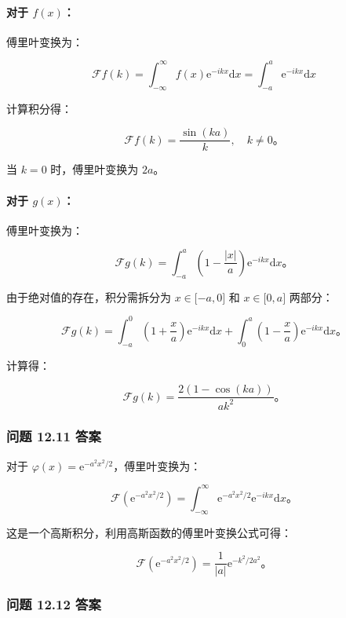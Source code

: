 \paragraph{\texorpdfstring{对于
\(f(x)\)：}{对于 f(x)：}}\label{ux5bf9ux4e8e-fx}

傅里叶变换为：

\[\mathcal{F}f(k) = \int_{- \infty}^{\infty}f(x)\mathrm{e}^{- ikx}\mathrm{d}x = \int_{- a}^{a}\mathrm{e}^{- ikx}\mathrm{d}x\]

计算积分得：

\[\mathcal{F}f(k) = \frac{\sin(ka)}{k},\quad k \neq 0。\]

当 \(k = 0\) 时，傅里叶变换为 \(2a\)。

\paragraph{\texorpdfstring{对于
\(g(x)\)：}{对于 g(x)：}}\label{ux5bf9ux4e8e-gx}

傅里叶变换为：

\[\mathcal{F}g(k) = \int_{- a}^{a}\left( 1 - \frac{|x|}{a} \right)\mathrm{e}^{- ikx}\mathrm{d}x。\]

由于绝对值的存在，积分需拆分为 \(x \in \lbrack - a,0\rbrack\) 和
\(x \in \lbrack 0,a\rbrack\) 两部分：

\[\mathcal{F}g(k) = \int_{- a}^{0}\left( 1 + \frac{x}{a} \right)\mathrm{e}^{- ikx}\mathrm{d}x + \int_{0}^{a}\left( 1 - \frac{x}{a} \right)\mathrm{e}^{- ikx}\mathrm{d}x。\]

计算得：

\[\mathcal{F}g(k) = \frac{2\left( 1 - \cos(ka) \right)}{ak^{2}}。\]

\subsubsection{问题 12.11 答案}\label{ux95eeux9898-12.11-ux7b54ux6848}

对于 \(\varphi(x) = \mathrm{e}^{- a^{2}x^{2}/2}\)，傅里叶变换为：

\[\mathcal{F}\left( \mathrm{e}^{- a^{2}x^{2}/2} \right) = \int_{- \infty}^{\infty}\mathrm{e}^{- a^{2}x^{2}/2}\mathrm{e}^{- ikx}\mathrm{d}x。\]

这是一个高斯积分，利用高斯函数的傅里叶变换公式可得：

\[\mathcal{F}\left( \mathrm{e}^{- a^{2}x^{2}/2} \right) = \frac{1}{|a|}\mathrm{e}^{- k^{2}/2a^{2}}。\]

\subsubsection{问题 12.12 答案}\label{ux95eeux9898-12.12-ux7b54ux6848}

